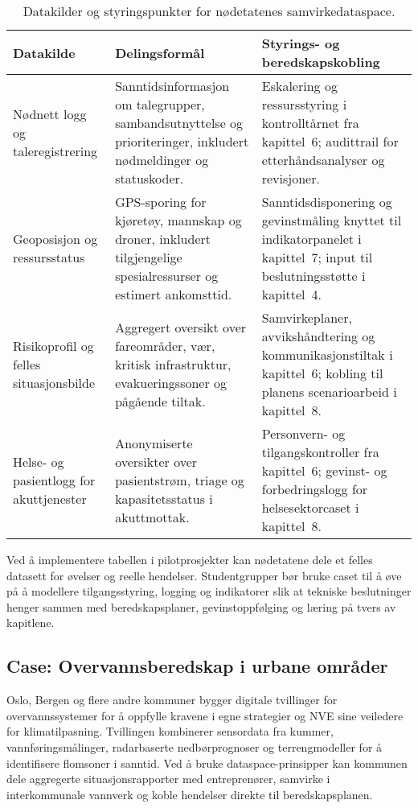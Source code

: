 \begin{table}[ht]
    \centering
    \caption{Datakilder og styringspunkter for nødetatenes samvirkedataspace.}
    \label{tab:samvirke-dataspace}
    \begin{tabular}{p{3.6cm}p{5.0cm}p{3.4cm}}
        \toprule
        \textbf{Datakilde} & \textbf{Delingsformål} & \textbf{Styrings- og beredskapskobling} \\
        \midrule
        Nødnett logg og taleregistrering & Sanntidsinformasjon om talegrupper, sambandsutnyttelse og prioriteringer, inkludert nødmeldinger og statuskoder. & Eskalering og ressursstyring i kontrolltårnet fra kapittel~6; audittrail for etterhåndsanalyser og revisjoner. \\
        \addlinespace
        Geoposisjon og ressursstatus & GPS-sporing for kjøretøy, mannskap og droner, inkludert tilgjengelige spesialressurser og estimert ankomsttid. & Sanntidsdisponering og gevinstmåling knyttet til indikatorpanelet i kapittel~7; input til beslutningsstøtte i kapittel~4. \\
        \addlinespace
        Risikoprofil og felles situasjonsbilde & Aggregert oversikt over fareområder, vær, kritisk infrastruktur, evakueringssoner og pågående tiltak. & Samvirkeplaner, avvikshåndtering og kommunikasjonstiltak i kapittel~6; kobling til planens scenarioarbeid i kapittel~8. \\
        \addlinespace
        Helse- og pasientlogg for akuttjenester & Anonymiserte oversikter over pasientstrøm, triage og kapasitetsstatus i akuttmottak. & Personvern- og tilgangskontroller fra kapittel~6; gevinst- og forbedringslogg for helsesektorcaset i kapittel~8. \\
        \bottomrule
    \end{tabular}
\end{table}

Ved å implementere tabellen i pilotprosjekter kan nødetatene dele et felles datasett for øvelser og reelle hendelser. Studentgrupper bør bruke caset til å øve på å modellere tilgangsstyring, logging og indikatorer slik at tekniske beslutninger henger sammen med beredskapsplaner, gevinstoppfølging og læring på tvers av kapitlene.

\subsection{Case: Overvannsberedskap i urbane områder}
Oslo, Bergen og flere andre kommuner bygger digitale tvillinger for overvannssystemer for å oppfylle kravene i egne strategier og NVE sine veiledere for klimatilpasning.\citep{oslo2022overvann,nve2021overvann} Tvillingen kombinerer sensordata fra kummer, vannføringsmålinger, radarbaserte nedbørprognoser og terrengmodeller for å identifisere flomsoner i sanntid. Ved å bruke dataspace-prinsipper kan kommunen dele aggregerte situasjonsrapporter med entreprenører, samvirke i interkommunale vannverk og koble hendelser direkte til beredskapsplanen.

